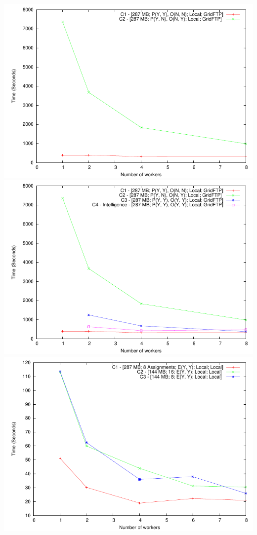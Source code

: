 \documentclass{rspublic}
\begin{document}
\includegraphics{data/graphs/IntelligentExtremes}
\includegraphics{data/graphs/IntelligentVsConventionalFigure}
\includegraphics{data/graphs/LocalFigure}
\end{document}
